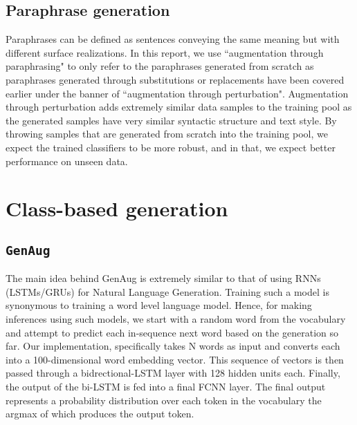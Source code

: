 \documentclass[11pt,a4paper]{article}
\begin{document}
    

\subsection*{Paraphrase generation}
Paraphrases can be defined as sentences conveying the same meaning but with different surface realizations. In this report, we use ``augmentation through paraphrasing" to only refer to the paraphrases generated from scratch as paraphrases generated through substitutions or replacements have been covered earlier under the banner of ``augmentation through perturbation". Augmentation through perturbation adds extremely similar data samples to the training pool as the generated samples have very similar syntactic structure and text style. By throwing samples that are generated from scratch into the training pool, we expect the trained classifiers to be more robust, and in that, we expect better performance on unseen data.

\section{Class-based generation}
\subsection{\texttt{GenAug}} 
The main idea behind GenAug is extremely similar to that of using RNNs (LSTMs/GRUs) for Natural Language Generation. Training such a model is synonymous to training a word level language model. Hence, for making inferences using such models, we start with a random word from the vocabulary and attempt to predict each in-sequence next word based on the generation so far. Our implementation, specifically takes N words as input and converts each into a 100-dimensional word embedding vector. This sequence of vectors is then passed through a bidrectional-LSTM layer with 128 hidden units each. Finally, the output of the bi-LSTM is fed into a final FCNN layer. The final output represents a probability distribution over each token in the vocabulary the argmax of which produces the output token.
\end{document}
